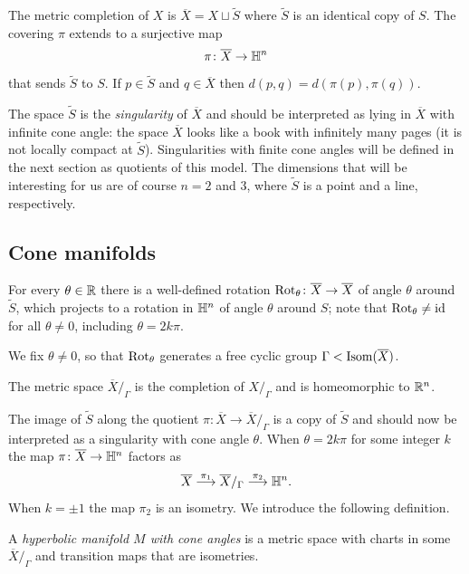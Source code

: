 \begin{ex}
The metric completion of $X$ is $\overline X = X \sqcup \tilde S$ where $\tilde S$ is an identical copy of $S$. The covering $\pi$ extends to a surjective map
$$\pi\colon \overline X \to \mathbb{H}^n$$
that sends $\tilde S$ to $S$. If $p\in \tilde S$ and $q\in \overline X$ then $d(p,q) = d(\pi(p), \pi(q)).$
\end{ex}

The space $\tilde S$ is the \emph{singularity} of $\overline X$ and should be interpreted as lying in $\overline X$ with infinite cone angle: the space $\overline X$ looks like a book with infinitely many pages (it is not locally compact at $\tilde S$). Singularities with finite cone angles will be defined in the next section as quotients of this model. The dimensions that will be interesting for us are of course $n=2$ and $3$, where $\tilde S$ is a point and a line, respectively.

\subsection{Cone manifolds}
For every $\theta\in \mathbb{R}$ there is a well-defined rotation ${\rm Rot}_\theta\colon \overline X \to \overline X$ of angle $\theta$ around $\tilde S$, which projects to a rotation in $\mathbb{H}^n$ of angle $\theta$ around $S$; note that ${\rm Rot}_\theta \neq {\rm id}$ for all $\theta \neq 0$, including $\theta = 2k\pi$.

We fix $\theta \neq 0$, so that ${\rm Rot}_\theta$ generates a free cyclic group $\Gamma < {\rm Isom}(\overline X)$.

\begin{ex}
The metric space $\overline X/_\Gamma$ is the completion of $X/_\Gamma$ and is homeomorphic to $\mathbb{R}^n$.
\end{ex}

The image of $\tilde S$ along the quotient $\pi\colon \overline X \to \overline X /_\Gamma$ is a copy of $\tilde S$ and should now be interpreted as a singularity with cone angle $\theta$. When $\theta = 2k\pi$ for some integer $k$ the map $\pi\colon \overline X \to \mathbb{H}^n$ factors as
$$\overline X \overset {\pi_1} {\longrightarrow} \overline X/_\Gamma \overset {\pi_2} \longrightarrow \mathbb{H}^n.$$
When $k=\pm 1$ the map $\pi_2$ is an isometry. We introduce the following definition.

\begin{defn}
A \emph{hyperbolic manifold $M$ with cone angles} is a metric space with charts in some $\overline X/_\Gamma$ and transition maps that are isometries.
\end{defn}

